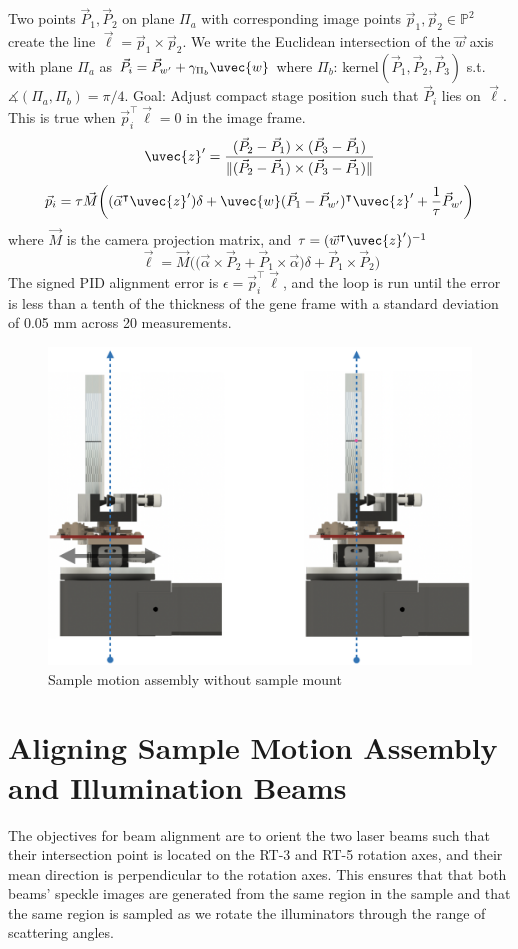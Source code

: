 Two points $\vec{P}_1, \vec{P}_2$ on plane $\Pi_a$ with corresponding image points $\vec{p}_1, \vec{p}_2 \in \mathbb{P}^2$ create the line $\vec{\ell} = \vec{p}_1 \times \vec{p}_2$. We write the Euclidean intersection of the $\vec{w}$ axis with plane $\Pi_a$ as $\vec{P}_i = \vec{P}_{w'} + \gamma_{\Pi_b} \uvec{w}$ where $\Pi_b$: kernel$(\vec{P}_1, \vec{P}_2, \vec{P}_3)$ s.t. $\measuredangle (\Pi_a, \Pi_b) = \pi/4$. Goal: Adjust compact stage position such that $\vec{P}_i$ lies on $\vec{\ell}$. This is true when $\vec{p}^\intercal_i \vec{\ell} = 0$ in the image frame.
\begin{equation}
    \uvec{z}' = \frac{(\vec{P}_2 - \vec{P}_1) \times (\vec{P}_3 - \vec{P}_1)}{\|(\vec{P}_2 - \vec{P}_1) \times (\vec{P}_3 - \vec{P}_1)\|}
\end{equation}
%
\begin{equation}
    \vec{p}_i = \tau \vec{M}\bigg((\vec{\alpha}^\intercal \uvec{z}') \delta + \uvec{w}(\vec{P}_1 - \vec{P}_{w'})^\intercal \uvec{z}'  + \frac{1}{\tau} \vec{P}_{w'} \bigg)
\end{equation}
where $\vec{M}$ is the camera projection matrix, and $\tau = (\vec{w}^\intercal \uvec{z}')^{-1}$
\begin{equation}
    \vec{\ell} = \vec{M} \Big(\big(\vec{\alpha} \times \vec{P}_2 + \vec{P}_1 \times \vec{\alpha}\big)\delta + \vec{P}_1 \times \vec{P}_2 \Big)
\end{equation}
%
The signed PID alignment error is $\epsilon = \vec{p}^\intercal_i \vec{\ell}$, and the loop is run until the error is less than a tenth of the thickness of the gene frame with a standard deviation of 0.05 mm across 20 measurements.

\begin{figure}
    \centering
    \includegraphics[width=0.5\linewidth]{../figures/compact_alignment.png}
    \caption{Sample motion assembly without sample mount}
    \label{fig:compact_alignment}
\end{figure}

\section{Aligning Sample Motion Assembly and Illumination Beams} %
The objectives for beam alignment are to orient the two laser beams such that their intersection point is located on the RT-3 and RT-5 rotation axes, and their mean direction is perpendicular to the rotation axes. This ensures that that both beams' speckle images are generated from the same region in the sample and that the same region is sampled as we rotate the illuminators through the range of scattering angles.

